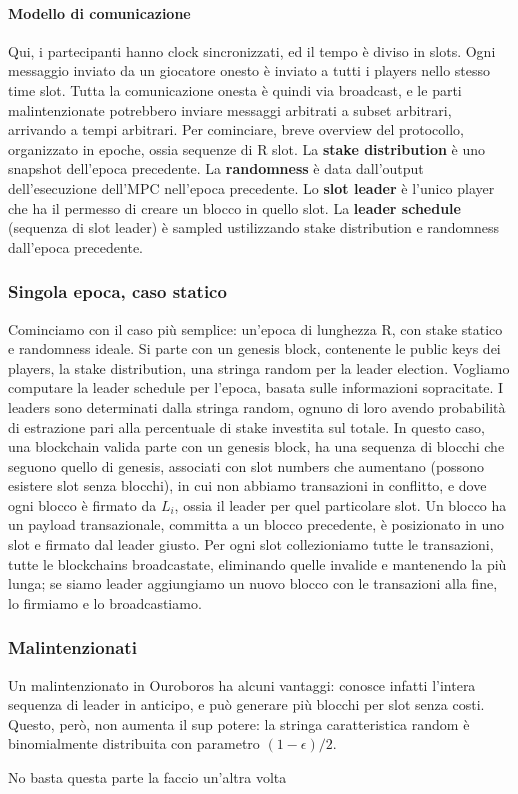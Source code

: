 \documentclass[11pt]{article}
\begin{document}
\paragraph{Modello di comunicazione} Qui, i partecipanti hanno clock sincronizzati, ed il tempo è diviso in slots. Ogni messaggio inviato da un giocatore onesto è inviato a tutti i players nello stesso time slot. Tutta la comunicazione onesta è quindi via broadcast, e le parti malintenzionate potrebbero inviare messaggi arbitrati a subset arbitrari, arrivando a tempi arbitrari. Per cominciare, breve overview del protocollo, organizzato in epoche, ossia sequenze di R slot. La \textbf{stake distribution} è uno snapshot dell'epoca precedente. La \textbf{randomness} è data dall'output dell'esecuzione dell'MPC nell'epoca precedente. Lo \textbf{slot leader} è l'unico player che ha il permesso di creare un blocco in quello slot. La \textbf{leader schedule} (sequenza di slot leader) è sampled ustilizzando stake distribution e randomness dall'epoca precedente.
\subsubsection{Singola epoca, caso statico}
Cominciamo con il caso più semplice: un'epoca di lunghezza R, con stake statico e randomness ideale. Si parte con un genesis block, contenente le public keys dei players, la stake distribution, una stringa random per la leader election. Vogliamo computare la leader schedule per l'epoca, basata sulle informazioni sopracitate. I leaders sono determinati dalla stringa random, ognuno di loro avendo probabilità di estrazione pari alla percentuale di stake investita sul totale. In questo caso, una blockchain valida parte con un genesis block, ha una sequenza di blocchi che seguono quello di genesis, associati con slot numbers che aumentano (possono esistere slot senza blocchi), in cui non abbiamo transazioni in conflitto, e dove ogni blocco è firmato da $L_i$, ossia il leader per quel particolare slot. Un blocco ha un payload transazionale, committa a un blocco precedente, è posizionato in uno slot e firmato dal leader giusto. Per ogni slot collezioniamo tutte le transazioni, tutte le blockchains broadcastate, eliminando quelle invalide e mantenendo la più lunga; se siamo leader aggiungiamo un nuovo blocco con le transazioni alla fine, lo firmiamo e lo broadcastiamo. 
\subsubsection{Malintenzionati}
 Un malintenzionato in Ouroboros ha alcuni vantaggi: conosce infatti l'intera sequenza di leader in anticipo, e può generare più blocchi per slot senza costi. Questo, però, non aumenta il sup potere: la stringa caratteristica random è binomialmente distribuita con parametro $(1-\epsilon)/2$. 

 No basta questa parte la faccio un'altra volta
\end{document}
